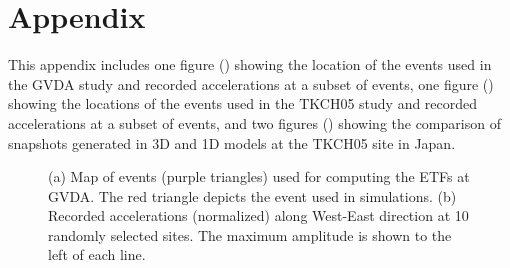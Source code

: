 \section*{Appendix}

This appendix includes one figure () showing the location of the events used in the GVDA study and recorded accelerations at a subset of events, one figure () showing the locations of the events used in the TKCH05 study and recorded accelerations at a subset of events, and two figures () showing the comparison of snapshots generated in 3D and 1D models at the TKCH05 site in Japan.

\clearpage
{}
\begin{figure}[!ht]
   \hfil
  \caption{(a) Map of events (purple triangles) used for computing the ETFs at GVDA. The red triangle depicts the event used in simulations. (b) Recorded accelerations (normalized) along West-East direction at 10 randomly selected sites. The maximum amplitude is shown to the left of each line.}
  \label{fig:etf-A1}
\end{figure}


